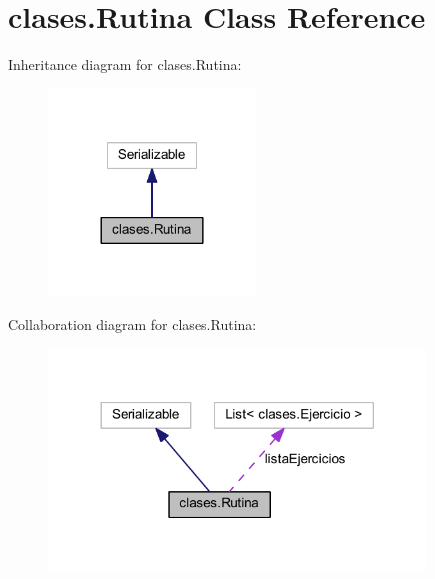 \hypertarget{classclases_1_1_rutina}{}\section{clases.\+Rutina Class Reference}
\label{classclases_1_1_rutina}


Inheritance diagram for clases.\+Rutina\+:
\nopagebreak
\begin{figure}[H]
\begin{center}
\leavevmode
\includegraphics[width=156pt]{classclases_1_1_rutina__inherit__graph}
\end{center}
\end{figure}


Collaboration diagram for clases.\+Rutina\+:
\nopagebreak
\begin{figure}[H]
\begin{center}
\leavevmode
\includegraphics[width=284pt]{classclases_1_1_rutina__coll__graph}
\end{center}
\end{figure}
